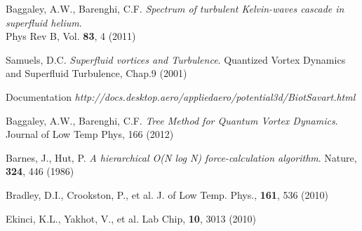 \begin{thebibliography}{99}
	{\sc Baggaley, A.W., Barenghi, C.F.}
	\emph{Spectrum of turbulent Kelvin-waves cascade in superfluid helium}.\\
	Phys Rev B, Vol. \textbf{83}, 4 (2011)

	{\sc Samuels, D.C.}
	\emph{Superfluid vortices and Turbulence}. Quantized Vortex Dynamics and Superfluid Turbulence, Chap.9 (2001)

	{\sc Documentation}
	\emph{http://docs.desktop.aero/appliedaero/potential3d/BiotSavart.html}

	{\sc Baggaley, A.W., Barenghi, C.F.}
	\emph{Tree Method for Quantum Vortex Dynamics}. Journal of Low Temp Phys, 166 (2012)

	{\sc Barnes, J., Hut, P.}
	\emph{A hierarchical O(N log N) force-calculation algorithm}. Nature, \textbf{324}, 446 (1986)


	{\sc Bradley, D.I., Crookston, P., et al.}
	\emph{} J. of Low Temp. Phys., \textbf{161}, 536 (2010)

	{\sc Ekinci, K.L., Yakhot, V., et al.}
	\emph{} Lab Chip, \textbf{10}, 3013 (2010)



\end{thebibliography}
